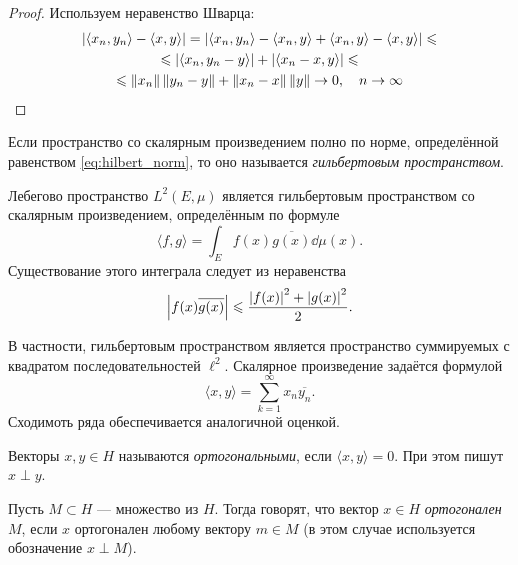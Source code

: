 \begin{proof}
    Используем неравенство Шварца:
    \begin{multline*}
        \left|\langle x_n , y_n \rangle - \langle x, y \rangle\right| = \left|\langle
            x_n, y_n \rangle - \langle x_n, y \rangle + \langle x_n, y \rangle -
        \langle x, y \rangle\right| \leqslant \\ \leqslant \left|\langle x_n, y_n - y \rangle\right| +
        \left|\langle x_n - x, y \rangle\right| \leqslant \\ \leqslant \left\|x_n\right\|\left\|y_n - y\right\| +
        \left\|x_n - x\right\|\left\|y\right\| \to 0, \quad n \to \infty
    \end{multline*}
\end{proof}

\begin{definition}
    Если пространство со скалярным произведением полно по норме, определённой
    равенством \eqref{eq:hilbert_norm}, то оно
    называется \emph{гильбертовым пространством}.
\end{definition}

\begin{example}
    Лебегово пространство $L^2(E, \mu)$ является гильбертовым пространством 
    со скалярным произведением, определённым по формуле
    \[ \langle f, g \rangle = \int_E f(x) \overline{g(x)} \dd \mu(x). \]
    Существование этого интеграла следует из неравенства
    \[ \left|f(x)\overline{g(x)}\right| \leqslant \frac{\left|f(x)\right|^2 + \left|g(x)\right|^2}{2}.
    \]
\end{example}

\begin{example}
    В частности, гильбертовым пространством является пространство суммируемых с
    квадратом последовательностей $\ell^2$. Скалярное произведение задаётся
    формулой
    \[ \langle x, y \rangle = \sum_{k=1}^\infty x_n \overline{y_n}. \]
    Сходимоть ряда обеспечивается аналогичной оценкой.
\end{example}

\begin{definition}
    Векторы $x, y \in H$ называются \emph{ортогональными}, если $\langle x, y \rangle =
    0$. При этом пишут $x \perp y$.
\end{definition}

\begin{definition}
    Пусть $M \subset H$ --- множество из $H$. Тогда говорят, что вектор
    $x \in H$ \emph{ортогонален} $M$, если $x$ ортогонален любому вектору $m \in
    M$ (в этом случае используется обозначение $x \perp M$).
\end{definition}

